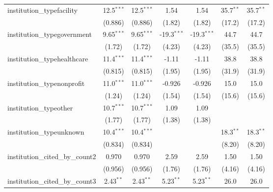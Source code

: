 \begin{tabular}{lcccccc}
   institution\_typefacility             & 12.5$^{***}$  & 12.5$^{***}$  & 1.54          & 1.54          & 35.7$^{**}$   & 35.7$^{**}$\\   
                                         & (0.886)       & (0.886)       & (1.82)        & (1.82)        & (17.2)        & (17.2)\\   
   institution\_typegovernment           & 9.65$^{***}$  & 9.65$^{***}$  & -19.3$^{***}$ & -19.3$^{***}$ & 44.7          & 44.7\\   
                                         & (1.72)        & (1.72)        & (4.23)        & (4.23)        & (35.5)        & (35.5)\\   
   institution\_typehealthcare           & 11.4$^{***}$  & 11.4$^{***}$  & -1.11         & -1.11         & 38.8          & 38.8\\   
                                         & (0.815)       & (0.815)       & (1.95)        & (1.95)        & (31.9)        & (31.9)\\   
   institution\_typenonprofit            & 11.0$^{***}$  & 11.0$^{***}$  & -0.926        & -0.926        & 15.0          & 15.0\\   
                                         & (1.24)        & (1.24)        & (1.54)        & (1.54)        & (15.6)        & (15.6)\\   
   institution\_typeother                & 10.7$^{***}$  & 10.7$^{***}$  & 1.09          & 1.09          &               &   \\   
                                         & (1.77)        & (1.77)        & (1.38)        & (1.38)        &               &   \\   
   institution\_typeunknown              & 10.4$^{***}$  & 10.4$^{***}$  &               &               & 18.3$^{**}$   & 18.3$^{**}$\\   
                                         & (0.834)       & (0.834)       &               &               & (8.20)        & (8.20)\\   
   institution\_cited\_by\_count2        & 0.970         & 0.970         & 2.59          & 2.59          & 1.50          & 1.50\\   
                                         & (0.956)       & (0.956)       & (1.76)        & (1.76)        & (4.16)        & (4.16)\\   
   institution\_cited\_by\_count3        & 2.43$^{**}$   & 2.43$^{**}$   & 5.23$^{**}$   & 5.23$^{**}$   & 26.0          & 26.0\\   

\end{tabular}
